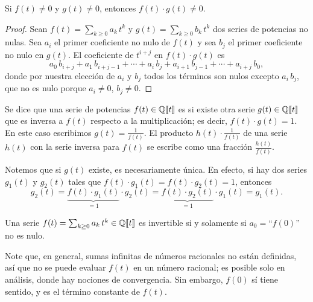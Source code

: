 \documentclass{article}
\begin{document}
\vspace{1em}

\begin{observacion*}
Si $f (t) \ne 0$ y $g (t) \ne 0$, entonces $f (t) \cdot g (t) \ne 0$.

\begin{proof}
Sean $f (t) = \sum_{k \ge 0} a_k\,t^k$ y $g (t) = \sum_{k \ge 0} b_k\,t^k$ dos series de potencias no nulas. Sea $a_i$ el primer coeficiente no nulo de $f (t)$ y sea $b_j$ el primer coeficiente no nulo en $g (t)$. El coeficiente de $t^{i+j}$ en $f (t) \cdot g (t)$ es
$$a_0\,b_{i+j} + a_1\,b_{i+j-1} + \cdots + a_i\,b_j + a_{i+1}\,b_{j-1} + \cdots + a_{i+j}\,b_0,$$
donde por nuestra elección de $a_i$ y $b_j$ todos los términos son nulos excepto $a_i\,b_j$, que no es nulo porque $a_i \ne 0$, $b_j \ne 0$.
\end{proof}
\end{observacion*}

\begin{definicion*}
Se dice que una serie de potencias $f (t) \in \mathbb{Q} [\![t]\!]$ es  si existe otra serie $g (t) \in \mathbb{Q} [\![t]\!]$ que es inversa a $f (t)$ respecto a la multiplicación; es decir, $f (t) \cdot g (t) = 1$. En este caso escribimos $g (t) = \frac{1}{f (t)}$. El producto $h (t) \cdot \frac{1}{f (t)}$ de una serie $h (t)$ con la serie inversa para $f (t)$ se escribe como una fracción $\frac{h (t)}{f (t)}$.
\end{definicion*}

Notemos que si $g (t)$ existe, es necesariamente única. En efecto, si hay dos series $g_1 (t)$ y $g_2 (t)$ tales que $f (t)\cdot g_1 (t) = f (t)\cdot g_2 (t) = 1$, entonces
$$g_2 (t) = \underbrace{f (t)\cdot g_1 (t)}_{= 1}\cdot g_2 (t) = \underbrace{f (t)\cdot g_2 (t)}_{=1}\cdot g_1 (t) = g_1 (t).$$

\begin{observacion*}
\label{obs:series-formales-invertibles}
Una serie $f (t) = \sum_{k \ge 0} a_k\,t^k \in \mathbb{Q} [\![t]\!]$ es invertible si y solamente si $a_0 = \text{``}f (0)\text{''}$ no es nulo.
\end{observacion*}

\noindent Note que, en general, sumas infinitas de números racionales no están definidas, así que no se puede evaluar $f (t)$ en un número racional; es posible solo en análisis, donde hay nociones de convergencia. Sin embargo, $f (0)$ sí tiene sentido, y es el término constante de $f (t)$.
\end{document}
